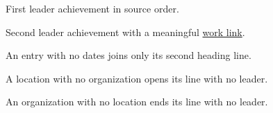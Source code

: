 \documentclass[entrymeta=leader]{careerdossier-resume}
\begin{document}
\MakeCDossierHeader
{}
\begin{CDossierEntry}[
  title={Engineer},
  organization={Example Labs},
  location={Toronto},
  dates={2024--2026}
]
\begin{CDossierItemize}
  \item First leader achievement in source order.
  \item Second leader achievement with a meaningful
        \href{https://example.test/work}{work link}.
\end{CDossierItemize}
\end{CDossierEntry}
\begin{CDossierEntry}[
  title={Dateless Engineer},
  organization={Example Services},
  location={Ottawa}
]
\begin{CDossierItemize}
  \item An entry with no dates joins only its second heading line.
\end{CDossierItemize}
\end{CDossierEntry}
\begin{CDossierEntry}[
  title={Volunteer Reviewer},
  location={Remote}
]
\begin{CDossierItemize}
  \item A location with no organization opens its line with no leader.
\end{CDossierItemize}
\end{CDossierEntry}
\begin{CDossierEntry}[
  title={Workshop Facilitator},
  organization={Example Trust}
]
\begin{CDossierItemize}
  \item An organization with no location ends its line with no leader.
\end{CDossierItemize}
\end{CDossierEntry}
\end{document}
